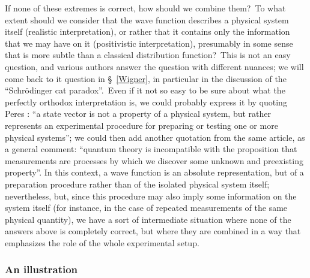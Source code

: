 \documentclass[12pt,onecolumn]{article}%
\begin{document}
If none of these extremes is correct, how should we combine them?\ To what
extent should we consider that the wave function describes a physical system
itself (realistic interpretation), or rather that it contains only the
information that we may have on it (positivistic interpretation), presumably
in some sense that is more subtle than a classical distribution
function?\ This is not an easy question, and various authors answer the
question with different nuances; we will come back to it question in
\S \ \ref{Wigner}, in particular in the discussion of the ``Schr\"{o}dinger
cat paradox''.\ Even if it not so easy to be sure about what the perfectly
orthodox interpretation is, we could probably express it by quoting Peres
\cite{Peres-2}: ``a state vector is not a property of a physical system, but
rather represents an experimental procedure for preparing or testing one or
more physical systems''; we could then add another quotation from the same
article, as a general comment: ``quantum theory is incompatible with the
proposition that measurements are processes by which we discover some unknown
and preexisting property''. In this context, a wave function is an absolute
representation, but of a preparation procedure rather than of the isolated
physical system itself; nevertheless, but, since this procedure may also imply
some information on the system itself (for instance, in the case of repeated
measurements of the same physical quantity), we have a sort of intermediate
situation where none of the answers above is completely correct, but where
they are combined in a way that emphasizes the role of the whole experimental setup.

\subsubsection{An illustration}

\label{illustration}
\end{document}
